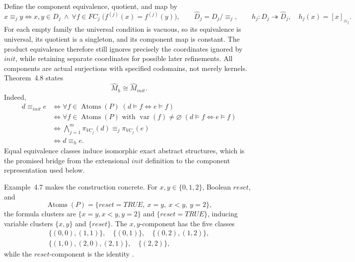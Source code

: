 Define the component equivalence, quotient, and map by
\[
 x\equiv_j y
 \iff
 x,y\in D_j\ \land\
 \forall f\in FC_j\;
    \bigl(f^{(j)}(x)=f^{(j)}(y)\bigr),
 \qquad
 \widehat D_j=D_j/{\equiv_j},
 \qquad
 h_j:D_j\twoheadrightarrow\widehat D_j,
 \quad h_j(x)=[x]_{\equiv_j}.
\]
For each empty family the universal condition is vacuous, so
its equivalence is universal, its quotient is a singleton, and its component
map is constant.  The product equivalence therefore still ignores precisely
the coordinates ignored by \(init\), while retaining separate coordinates for
possible later refinements.  All components are actual surjections with
specified codomains, not merely kernels.
Theorem~4.8 states
\[
 \widehat M_h\cong\widehat M_{init}.
\]
Indeed,
\[
\begin{aligned}
 d\equiv_{init}e
 &\iff
   \forall f\in\operatorname{Atoms}(P)\;
      (d\models f\iff e\models f)\\
 &\iff
   \forall f\in\operatorname{Atoms}(P)\text{ with }
      \operatorname{var}(f)\ne\varnothing\;
      (d\models f\iff e\models f)\\
 &\iff
   \bigwedge_{j=1}^{m}
     \pi_{VC_j}(d)\equiv_j\pi_{VC_j}(e)\\
 &\iff d\equiv_he.
\end{aligned}
\]
Equal equivalence classes induce isomorphic exact abstract structures, which
is the promised bridge from the extensional \(init\) definition to the
component representation used below.

Example~4.7 makes the construction concrete.  For
\(x,y\in\{0,1,2\}\), Boolean \(reset\), and
\[
 \operatorname{Atoms}(P)
  =\{reset=TRUE,\ x=y,\ x<y,\ y=2\},
\]
the formula clusters are
\(\{x=y,x<y,y=2\}\) and \(\{reset=TRUE\}\), inducing variable clusters
\(\{x,y\}\) and \(\{reset\}\).  The \(x,y\)-component has the five classes
\[
\begin{gathered}
 \{(0,0),(1,1)\},\quad \{(0,1)\},\quad
 \{(0,2),(1,2)\},\\
 \{(1,0),(2,0),(2,1)\},\quad \{(2,2)\},
\end{gathered}
\]
while the \(reset\)-component is the identity
\cite[\S4.2.3, ex.~4.7, and thm.~4.8; pp.~769--771]{ClarkeEtAl2003}.

